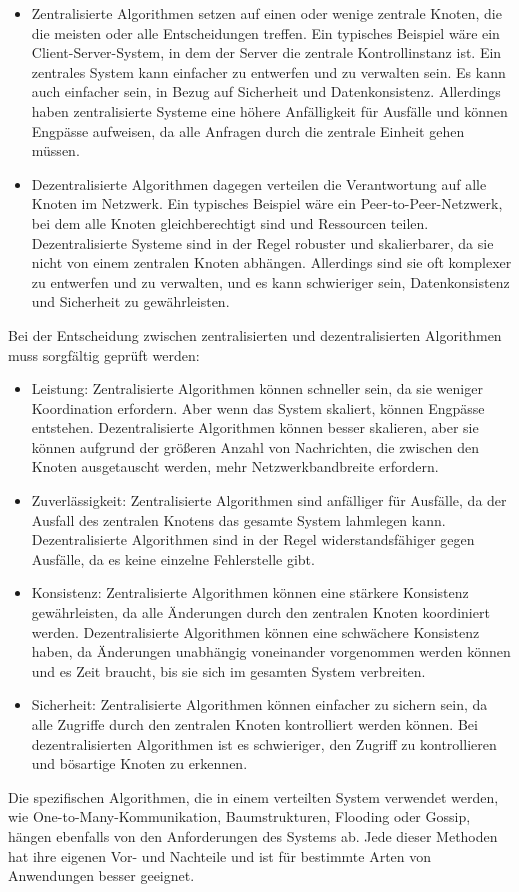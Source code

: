 \begin{itemize}
\item Zentralisierte Algorithmen setzen auf einen oder wenige zentrale Knoten, die die meisten oder alle Entscheidungen treffen. Ein typisches Beispiel wäre ein Client-Server-System, in dem der Server die zentrale Kontrollinstanz ist. Ein zentrales System kann einfacher zu entwerfen und zu verwalten sein. Es kann auch einfacher sein, in Bezug auf Sicherheit und Datenkonsistenz. Allerdings haben zentralisierte Systeme eine höhere Anfälligkeit für Ausfälle und können Engpässe aufweisen, da alle Anfragen durch die zentrale Einheit gehen müssen.

\item Dezentralisierte Algorithmen dagegen verteilen die Verantwortung auf alle Knoten im Netzwerk. Ein typisches Beispiel wäre ein Peer-to-Peer-Netzwerk, bei dem alle Knoten gleichberechtigt sind und Ressourcen teilen. Dezentralisierte Systeme sind in der Regel robuster und skalierbarer, da sie nicht von einem zentralen Knoten abhängen. Allerdings sind sie oft komplexer zu entwerfen und zu verwalten, und es kann schwieriger sein, Datenkonsistenz und Sicherheit zu gewährleisten.
\end{itemize}
Bei der Entscheidung zwischen zentralisierten und dezentralisierten Algorithmen muss sorgfältig geprüft werden:
\begin{itemize}
\item Leistung: Zentralisierte Algorithmen können schneller sein, da sie weniger Koordination erfordern. Aber wenn das System skaliert, können Engpässe entstehen. Dezentralisierte Algorithmen können besser skalieren, aber sie können aufgrund der größeren Anzahl von Nachrichten, die zwischen den Knoten ausgetauscht werden, mehr Netzwerkbandbreite erfordern.
\item Zuverlässigkeit: Zentralisierte Algorithmen sind anfälliger für Ausfälle, da der Ausfall des zentralen Knotens das gesamte System lahmlegen kann. Dezentralisierte Algorithmen sind in der Regel widerstandsfähiger gegen Ausfälle, da es keine einzelne Fehlerstelle gibt.
\item Konsistenz: Zentralisierte Algorithmen können eine stärkere Konsistenz gewährleisten, da alle Änderungen durch den zentralen Knoten koordiniert werden. Dezentralisierte Algorithmen können eine schwächere Konsistenz haben, da Änderungen unabhängig voneinander vorgenommen werden können und es Zeit braucht, bis sie sich im gesamten System verbreiten.
\item Sicherheit: Zentralisierte Algorithmen können einfacher zu sichern sein, da alle Zugriffe durch den zentralen Knoten kontrolliert werden können. Bei dezentralisierten Algorithmen ist es schwieriger, den Zugriff zu kontrollieren und bösartige Knoten zu erkennen.
\end{itemize}
Die spezifischen Algorithmen, die in einem verteilten System verwendet werden, wie One-to-Many-Kommunikation, Baumstrukturen, Flooding oder Gossip, hängen ebenfalls von den Anforderungen des Systems ab. Jede dieser Methoden hat ihre eigenen Vor- und Nachteile und ist für bestimmte Arten von Anwendungen besser geeignet.

